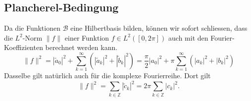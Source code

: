 \subsection{Plancherel-Bedingung}
Da die Funktionen $\mathcal{B}$ eine Hilbertbasis bilden, können wir sofort
schliessen, dass die $L^2$-Norm $\|f\|$ einer Funktion $f\in L^2([0,2\pi])$
auch mit den Fourier-Koeffizienten berechnet werden kann.
\[
\| f \|^2
=
|\tilde{a}_0|^2
+
\sum_{k=1}^\infty
(
|\tilde{a}_k|^2
+
|\tilde{b}_k|^2
)
=
\frac{\pi}{2}
|a_0|^2
+
\pi
\sum_{k=1}^\infty
(
|a_k|^2
+
|b_k|^2
)
\]
Dasselbe gilt natürlich auch für die komplexe Fourierreihe.
Dort gilt
\[
\| f\|^2
=
\sum_{k\in\mathbb Z} |\tilde{c}_k|^2
=
2\pi \sum_{k\in\mathbb Z} |c_k|^2.
\]





